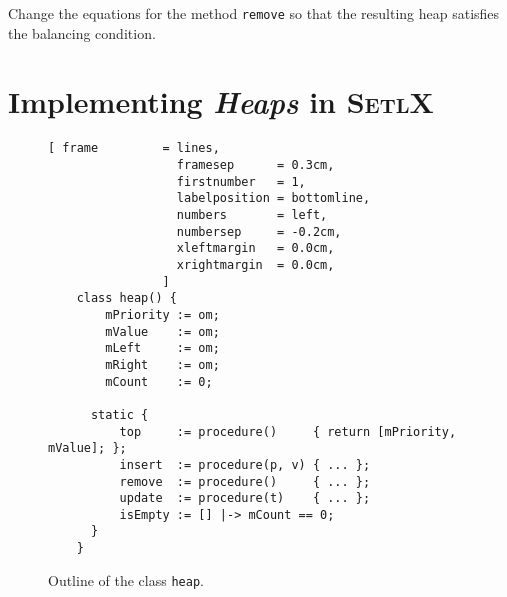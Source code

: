 \exercise
Change the equations for the method \texttt{remove} so that the resulting heap satisfies the
balancing condition.



\section[Implementation]{Implementing \textsl{Heaps} in \textsc{SetlX}}

\begin{figure}[bt]
\centering
\begin{Verbatim}[ frame         = lines, 
                  framesep      = 0.3cm, 
                  firstnumber   = 1,
                  labelposition = bottomline,
                  numbers       = left,
                  numbersep     = -0.2cm,
                  xleftmargin   = 0.0cm,
                  xrightmargin  = 0.0cm,
                ]
    class heap() {
        mPriority := om;
        mValue    := om;
        mLeft     := om;
        mRight    := om;
        mCount    := 0;
    
      static {
          top     := procedure()     { return [mPriority, mValue]; };
          insert  := procedure(p, v) { ... };
          remove  := procedure()     { ... };
          update  := procedure(t)    { ... };
          isEmpty := [] |-> mCount == 0;
      }
    }
\end{Verbatim}
\vspace*{-0.3cm}
\caption{Outline of the class \texttt{heap}.}
\label{fig:heap.stlx-outline}
\end{figure}

